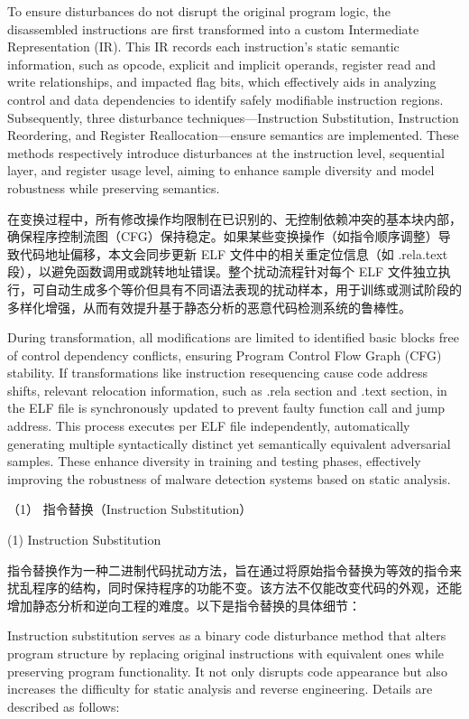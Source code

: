 To ensure disturbances do not disrupt the original program logic, the disassembled instructions are first transformed into a custom Intermediate Representation (IR). This IR records each instruction's static semantic information, such as opcode, explicit and implicit operands, register read and write relationships, and impacted flag bits, which effectively aids in analyzing control and data dependencies to identify safely modifiable instruction regions. Subsequently, three disturbance techniques—Instruction Substitution, Instruction Reordering, and Register Reallocation—ensure semantics are implemented. These methods respectively introduce disturbances at the instruction level, sequential layer, and register usage level, aiming to enhance sample diversity and model robustness while preserving semantics.

在变换过程中，所有修改操作均限制在已识别的、无控制依赖冲突的基本块内部，确保程序控制流图（CFG）保持稳定。如果某些变换操作（如指令顺序调整）导致代码地址偏移，本文会同步更新 ELF 文件中的相关重定位信息（如 .rela.text 段），以避免函数调用或跳转地址错误。整个扰动流程针对每个 ELF 文件独立执行，可自动生成多个等价但具有不同语法表现的扰动样本，用于训练或测试阶段的多样化增强，从而有效提升基于静态分析的恶意代码检测系统的鲁棒性。

During transformation, all modifications are limited to identified basic blocks free of control dependency conflicts, ensuring Program Control Flow Graph (CFG) stability. If transformations like instruction resequencing cause code address shifts, relevant relocation information, such as .rela section and .text section, in the ELF file is synchronously updated to prevent faulty function call and jump address. This process executes per ELF file independently, automatically generating multiple syntactically distinct yet semantically equivalent adversarial samples. These enhance diversity in training and testing phases, effectively improving the robustness of malware detection systems based on static analysis.

（1） 指令替换（Instruction Substitution）

(1) Instruction Substitution

指令替换作为一种二进制代码扰动方法，旨在通过将原始指令替换为等效的指令来扰乱程序的结构，同时保持程序的功能不变。该方法不仅能改变代码的外观，还能增加静态分析和逆向工程的难度。以下是指令替换的具体细节：

Instruction substitution serves as a binary code disturbance method that alters program structure by replacing original instructions with equivalent ones while preserving program functionality. It not only disrupts code appearance but also increases the difficulty for static analysis and reverse engineering. Details are described as follows:

